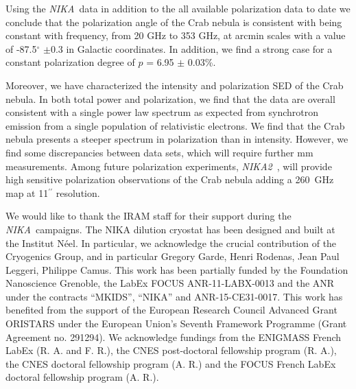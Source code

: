 \documentclass[twocolumn,traditabstract]{aa}
\def\NIKA{\textit{NIKA}}
\def\NIKAd{\textit{NIKA2}}
\begin{document}
Using the \NIKA\ data in addition to the all available polarization data to date we conclude that the
polarization angle of the Crab nebula is consistent with being constant with
frequency, from 20 GHz to 353 GHz, at arcmin scales with a value of
-87.5$^{\circ}$ $\pm$0.3 in Galactic coordinates.
In addition, we find a strong case for a constant polarization degree of $p$ = 6.95 $\pm$ 0.03\%. 

Moreover, we have characterized the intensity and polarization SED of the Crab nebula. In both total power and polarization, we find that the data are overall consistent with a single power law spectrum as expected from synchrotron emission from a single population of relativistic electrons.
We find that the Crab nebula presents a steeper spectrum in polarization than in intensity. 
However, we find some discrepancies between data sets, which will require further mm measurements. Among future polarization experiments, \NIKAd\ \citep{calvo2016}, will provide high sensitive polarization observations of the Crab nebula adding a 260~GHz map at 11$^{\prime\prime}$ resolution.



\vspace{0.2cm}
 \begin{acknowledgements}
We would like to thank the IRAM staff for their support during the \NIKA\ campaigns. 
The NIKA dilution cryostat has been designed and built at the Institut N\'eel. 
In particular, we acknowledge the crucial contribution of the Cryogenics Group, and 
in particular Gregory Garde, Henri Rodenas, Jean Paul Leggeri, Philippe Camus. 
This work has been partially funded by the Foundation Nanoscience Grenoble, the LabEx FOCUS ANR-11-LABX-0013 and 
the ANR under the contracts ``MKIDS'', ``NIKA'' and ANR-15-CE31-0017. 
This work has benefited from the support of the European Research Council Advanced Grant ORISTARS 
under the European Union's Seventh Framework Programme (Grant Agreement no. 291294).
We acknowledge fundings from the ENIGMASS French LabEx (R. A. and F. R.), 
the CNES post-doctoral fellowship program (R. A.),  the CNES doctoral fellowship program (A. R.) and 
the FOCUS French LabEx doctoral fellowship program (A. R.).
\end{acknowledgements}
\end{document}
